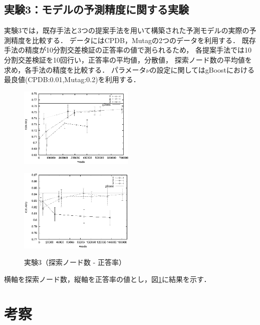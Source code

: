 \section{実験3：モデルの予測精度に関する実験}
実験3では，既存手法と3つの提案手法を用いて構築された予測モデルの実際の予測精度を比較する．
データにはCPDB，Mutagの2つのデータを利用する．
既存手法の精度が10分割交差検証の正答率の値で測られるため，
各提案手法では10分割交差検証を10回行い，正答率の平均値，分散値，
探索ノード数の平均値を求め，各手法の精度を比較する．
パラメータ$\nu$の設定に関してはgBoostにおける最良値(CPDB:0.01,Mutag:0.2)を利用する．
\begin{figure}[t]
	\begin{minipage}{0.5\hsize}
		\begin{center}
			\includegraphics[width=55mm]{cpdb/node_acc.eps}
		\end{center}
		\vspace{-0.5cm}
		\label{fig:10}
	\end{minipage}
	\begin{minipage}{0.5\hsize}
		\begin{center}
			\includegraphics[width=55mm]{mutag/node_acc.eps}
		\end{center}
		\vspace{-0.5cm}
		\label{fig:11}
	\end{minipage}
	\vspace{-0.3cm}
	\caption{実験3（探索ノード数 - 正答率）}
	\label{ACC}
\end{figure}
横軸を探索ノード数，縦軸を正答率の値とし，図\ref{ACC}に結果を示す．

\chapter{考察}
\label{考察}

